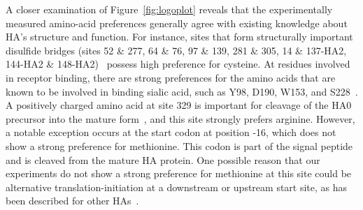 \documentclass[9pt,twocolumn,twoside]{pnas-new}
\begin{document}
A closer examination of Figure~\ref{fig:logoplot} reveals that the experimentally measured amino-acid preferences generally agree with existing knowledge about HA's structure and function.
For instance, sites that form structurally important disulfide bridges (sites 52 \& 277, 64 \& 76, 97 \& 139, 281 \& 305, 14 \& 137-HA2, 144-HA2 \& 148-HA2)~\cite{waterfield1981disulphide} possess high preference for cysteine.
At residues involved in receptor binding, there are strong preferences for the amino acids that are known to be involved in binding sialic acid, such as Y98, D190, W153, and S228~\cite{weis1988structure,martin1998studies,nobusawa2000change,yang2015structure}.
A positively charged amino acid at site 329 is important for cleavage of the HA0 precursor into the mature form~\cite{stech2005new}, and this site strongly prefers arginine.
However, a notable exception occurs at the start codon at position -16, which does not show a strong preference for methionine. 
This codon is part of the signal peptide and is cleaved from the mature HA protein.
One possible reason that our experiments do not show a strong preference for methionine at this site could be alternative translation-initiation at a downstream or upstream start site, as has been described for other HAs~\cite{girard2011upstream}.
\end{document}

